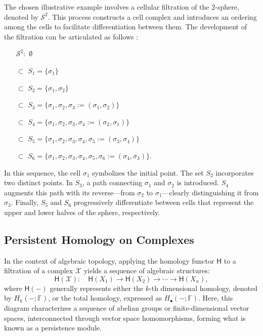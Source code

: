 \begin{example}
	\label{filteredsphere} The chosen illustrative example involves a cellular filtration
	of the 2-sphere, denoted by $\mathcal{S}^{2}$. This process constructs a cell complex
	and introduces an ordering among the cells to facilitate differentiation between
	them. The development of the filtration can be articulated as follows
	\cite[\S 2.2]{de2011dualities}:

	\begin{itemize}
		\item[$\mathcal{S}^{2}:$] $\emptyset$

		\item[$\subset$] $S_{1} = \{\sigma_{1}\}$

		\item[$\subset$] $S_{2} = \{\sigma_{1}, \sigma_{2}\}$

		\item[$\subset$] $S_{3} = \{\sigma_{1}, \sigma_{2}, \sigma_{3} := (\sigma_{1}
			, \sigma_{2})\}$

		\item[$\subset$] $S_{4} = \{\sigma_{1}, \sigma_{2}, \sigma_{3}, \sigma_{4} :=
			(\sigma_{2}, \sigma_{1})\}$

		\item[$\subset$] $S_{5} = \{\sigma_{1}, \sigma_{2}, \sigma_{3}, \sigma_{4}, \sigma
			_{5} := (\sigma_{3}, \sigma_{4})\}$

		\item[$\subset$] $S_{6} = \{\sigma_{1}, \sigma_{2}, \sigma_{3}, \sigma_{4}, \sigma
			_{5}, \sigma_{6} := (\sigma_{4}, \sigma_{3})\}.$
	\end{itemize}

	In this sequence, the cell $\sigma_{1}$ symbolizes the initial point. The set $S
	_{2}$ incorporates two distinct points. In $S_{3}$, a path connecting $\sigma_{1}$
	and $\sigma_{2}$ is introduced. $S_{4}$ augments this path with its
	reverse—from $\sigma_{2}$ to $\sigma_{1}$—clearly distinguishing it from $\sigma
	_{3}$. Finally, $S_{5}$ and $S_{6}$ progressively differentiate between cells that
	represent the upper and lower halves of the sphere, respectively.
\end{example}

\subsection{Persistent Homology on Complexes}
In the context of algebraic topology, applying the homology functor $\mathsf{H}$
to a filtration of a complex $\mathcal{X}$ yields a sequence of algebraic structures:
\begin{equation}
	\mathsf{H}(\mathcal{X}): \quad \mathsf{H}(X_{1}) \to \mathsf{H}(X_{2}) \to \cdots
	\to \mathsf{H}(X_{n}),
\end{equation}
where $\mathsf{H}(-)$ generally represents either the $k$-th dimensional
homology, denoted by $H_{k}(-;\mathbb{F})$, or the total homology, expressed as $H
_{\bullet}(-;\mathbb{F})$. Here, this diagram characterizes a sequence of abelian
groups or finite-dimensional vector spaces, interconnected through vector space
homomorphisms, forming what is known as a persistence module.

